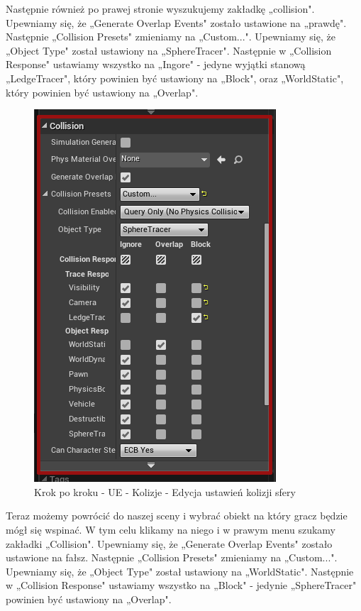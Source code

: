 \documentclass[12pt]{xmgr}
\begin{document}
Następnie również po prawej stronie wyszukujemy zakładkę „collision". Upewniamy się, że „Generate Overlap Events" zostało ustawione na „prawdę". Następnie „Collision Presets" zmieniamy na „Custom...". Upewniamy się, że „Object Type" został ustawiony na „SphereTracer". Następnie w „Collision Response" ustawiamy wszystko na „Ingore" - jedyne wyjątki stanową „LedgeTracer", który powinien być ustawiony na „Block", oraz „WorldStatic", który powinien być ustawiony na „Overlap".

\begin{figure}[!htb]
    \begin{center}
    \includegraphics[scale=0.35]{Screeny/UeKrokPoKroku/UE-Climb-Sphere03.png}
    \end{center}
    \caption{Krok po kroku - UE - Kolizje - Edycja ustawień kolizji sfery}
\end{figure}
\newpage

Teraz możemy powrócić do naszej sceny i wybrać obiekt na który gracz będzie mógł się wspinać. W tym celu klikamy na niego i w prawym menu szukamy zakładki „Collision". Upewniamy się, że „Generate Overlap Events" zostało ustawione na fałsz. Następnie „Collision Presets" zmieniamy na „Custom...". Upewniamy się, że „Object Type" został ustawiony na „WorldStatic". Następnie w „Collision Response" ustawiamy wszystko na „Block" - jedynie „SphereTracer" powinien być ustawiony na „Overlap".
\end{document}
